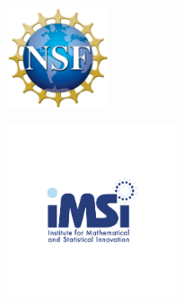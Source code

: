 \vspace{-4ex}
\begin{center}

	    \begin{minipage}{0.2\textwidth}
		\centering
		\includegraphics[height=3cm]{Photos/nsf_logo.png}
	\end{minipage}
	\hspace{2em}
	\begin{minipage}{0.2\textwidth}
		\centering
		\includegraphics[height=5cm]{Photos/imsi_logo.png}
	\end{minipage} \\[-2em]
	

\end{center}
